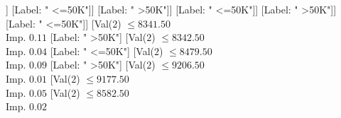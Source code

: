 \documentclass[margin=10pt]{standalone}
\begin{document}
\begin{forest}
																																															[Label: " <=50K"]
																																															[Val($2$) $ \leq 7768.50$ \\ Imp. $0.03$
																																																[Label: " >50K"]
																																																[Val($2$) $ \leq 8279.50$ \\ Imp. $0.01$
																																																	[Val($2$) $ \leq 8094.50$ \\ Imp. $0.11$
																																																		[Val($2$) $ \leq 8085.50$ \\ Imp. $0.14$
																																																			[Val($2$) $ \leq 7919.50$ \\ Imp. $0.20$
																																																				[Val($2$) $ \leq 7890.50$ \\ Imp. $0.46$
																																																					[Val($2$) $ \leq 7796.50$ \\ Imp. $0.31$
																																																						[Val($2$) $ \leq 7791.50$ \\ Imp. $1.00$
																																																							[Label: " <=50K"]
																																																							[Label: " >50K"]]
																																																						[Label: " <=50K"]]
																																																					[Label: " >50K"]]
																																																				[Label: " <=50K"]]
																																																			[Label: " >50K"]]
																																																		[Label: " <=50K"]]
																																																	[Val($2$) $ \leq 8341.50$ \\ Imp. $0.11$
																																																		[Label: " >50K"]
																																																		[Val($2$) $ \leq 8342.50$ \\ Imp. $0.04$
																																																			[Label: " <=50K"]
																																																			[Val($2$) $ \leq 8479.50$ \\ Imp. $0.09$
																																																				[Label: " >50K"]
																																																				[Val($2$) $ \leq 9206.50$ \\ Imp. $0.01$
																																																					[Val($2$) $ \leq 9177.50$ \\ Imp. $0.05$
																																																						[Val($2$) $ \leq 8582.50$ \\ Imp. $0.02$

\end{forest}
\end{document}
